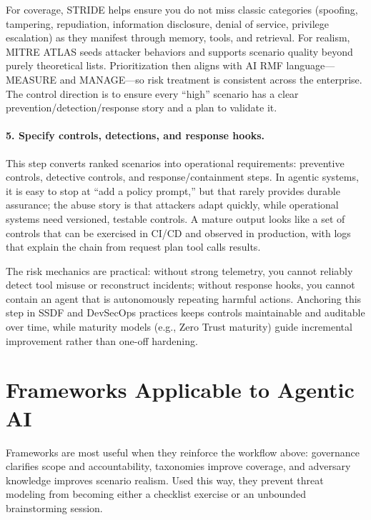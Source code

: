 \begin{TNtwocol}
  For coverage, STRIDE helps ensure you do not miss classic categories (spoofing, tampering, repudiation, information disclosure, denial of service, privilege escalation) as they manifest through memory, tools, and retrieval. For realism, MITRE ATLAS seeds attacker behaviors and supports scenario quality beyond purely theoretical lists. Prioritization then aligns with AI RMF language—MEASURE and MANAGE—so risk treatment is consistent across the enterprise. The control direction is to ensure every “high” scenario has a clear prevention/detection/response story and a plan to validate it. \cite{nist-airmf-100-1,mitre-atlas}

  \paragraph{5. Specify controls, detections, and response hooks.}
  This step converts ranked scenarios into operational requirements: preventive controls, detective controls, and response/containment steps. In agentic systems, it is easy to stop at “add a policy prompt,” but that rarely provides durable assurance; the abuse story is that attackers adapt quickly, while operational systems need versioned, testable controls. A mature output looks like a set of controls that can be exercised in CI/CD and observed in production, with logs that explain the chain from request \rightarrow plan \rightarrow tool calls \rightarrow results.

  The risk mechanics are practical: without strong telemetry, you cannot reliably detect tool misuse or reconstruct incidents; without response hooks, you cannot contain an agent that is autonomously repeating harmful actions. Anchoring this step in SSDF and DevSecOps practices keeps controls maintainable and auditable over time, while maturity models (e.g., Zero Trust maturity) guide incremental improvement rather than one-off hardening. \cite{nist-sp800-218,cisa-ztmm-v2}

  \section{Frameworks Applicable to Agentic AI}

  Frameworks are most useful when they reinforce the workflow above: governance clarifies scope and accountability, taxonomies improve coverage, and adversary knowledge improves scenario realism. Used this way, they prevent threat modeling from becoming either a checklist exercise or an unbounded brainstorming session.


\end{TNtwocol}
